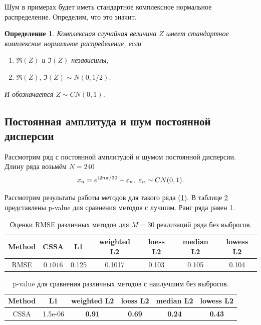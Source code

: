 \documentclass[specialist,
               substylefile = spbu.rtx,
               subf,href,colorlinks=true, 12pt]{disser}
\newtheorem*{def*}{Определение}
\begin{document}
Шум в примерах будет иметь стандартное комплексное нормальное распределение. Определим, что это значит.
\begin{def*}
	Комплексная случайная величина $Z$ имеет стандартное комплексное нормальное распределение, если
	\begin{enumerate}
		\item $\Re(Z)$ и $\Im(Z)$ независимы,
		\item $\Re(Z), \, \Im(Z) \sim N(0, 1/2)$.
	\end{enumerate}
	И обозначается $Z \sim CN(0, 1)$. 
\end{def*}


\subsection{Постоянная амплитуда и шум постоянной дисперсии}

Рассмотрим ряд с постоянной амплитудой и шумом постоянной дисперсии.
Длину ряда возьмём $N = 240$
$$x_n = e^{\mathrm{i}\mkern1mu 2n\pi/30} + \varepsilon_n, ~ \varepsilon_n \sim CN(0,1).$$
 
Рассмотрим результаты работы методов для такого ряда (\ref{tab1}). В таблице \ref{tab: pval1} представлены p-value для сравнения методов с лучшим. Ранг ряда равен 1.

\begin{table}[H]
	\begin{center}
		\caption{Оценки RMSE различных методов для $M = 30$ реализаций ряда без выбросов.}
		\label{tab1}
		\begin{tabular}{|c|c|c|c|c|c|c|}
			\hline
			Method 	& CSSA & L1 & weighted L2 & loess L2 & median L2 & lowess L2 \\ 
			\hline
			RMSE & $\mathbf{0.1016}$  & 0.125  & 0.1017 & 0.103 & 0.105 & 0.104\\
			\hline
		\end{tabular}
	\end{center}
\end{table}

\begin{table}[H]
	\caption{p-value для сравнения различных методов с наилучшим без выбросов.}
	\label{tab: pval1}
	\begin{center}
		\begin{tabular}{|c|c|c|c|c|c|}
			\hline
			Method & L1 & weighted L2 & loess L2 & median L2 & lowess L2  \\ 
			\hline
			CSSA & 1.5e-06   & \textbf{0.91} & \textbf{0.69}  & \textbf{0.24} & \textbf{0.43}  \\
			\hline
		\end{tabular} \\
	\end{center}
\end{table}
\end{document}
